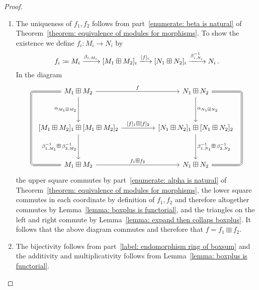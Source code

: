\begin{proof}
  \leavevmode
  \begin{enumerate}
    \item
      The uniqueness of $f_1, f_2$ follows from part~\ref*{enumerate: beta is natural} of Theorem~\ref*{theorem: equivalence of modules for morphisms}.
      To show the existence we define $f_i \colon M_i \to N_i$ by
      \[
          f_i
        \defined 
          M_i
        \xlongrightarrow{\beta_{i,M_i}}
          [M_1 \boxplus M_2]_i
        \xlongrightarrow{[f]_i}
          [N_1 \boxplus N_2]_i
        \xlongrightarrow{\beta_{i,N_i}^{-1}}
          N_i \,.
      \]
      In the diagram
      \[
        \begin{tikzcd}[sep = huge]
            M_1 \boxplus M_2
            \arrow{r}[above]{f}
            \arrow{d}[left]{\alpha_{M_1 \boxplus M_2}}
            \arrow[rounded corners,
                   equal,
                   to path =
                   { -- ([xshift=-1.5cm] \tikztostart.west)
                     |- (\tikztotarget) }
                  ]{dd}
          & N_1 \boxplus N_2
            \arrow{d}[right]{\alpha_{N_1 \boxplus N_2}}
            \arrow[rounded corners,
                   equal,
                   to path =
                   { -- ([xshift=1.5cm]\tikztostart.east)
                     |- (\tikztotarget) }
                  ]{dd}
          \\
            {[M_1 \boxplus M_2]_1} \boxplus {[M_1 \boxplus M_2]_2}
            \arrow{r}[above]{[f]_1 \boxplus [f]_2}
            \arrow{d}[left]{\beta_{1,M_1}^{-1} \boxplus \, \beta_{2,M_2}^{-1}}
          & {[N_1 \boxplus N_2]_1} \boxplus {[N_1 \boxplus N_2]_2}
            \arrow{d}[right]{\beta_{1,N_1}^{-1} \boxplus \, \beta_{2,N_2}^{-1}}
          \\
            M_1 \boxplus M_2
            \arrow{r}[above]{{f_1} \boxplus {f_2}}
          & N_1 \boxplus N_2
        \end{tikzcd}
      \]
      the upper square commutes by part~\ref*{enumerate: alpha is natural} of Theorem~\ref*{theorem: equivalence of modules for morphisms}, the lower square commutes in each coordinate by definition of $f_1, f_2$ and therefore altogether commutes by Lemma~\ref{lemma: boxplus is functorial}, and the triangles on the left and right commute by Lemma~\ref{lemma: expand then collaps boxplus}.
      It follows that the above diagram commutes and therefore that $f = f_1 \boxplus f_2$.
    \item
      The bijectivity follows from part~\ref*{label: endomorphism ring of boxsum} and the additivity and multiplicativity follows from Lemma~\ref{lemma: boxplus is functorial}.
    \qedhere
  \end{enumerate}
\end{proof}


